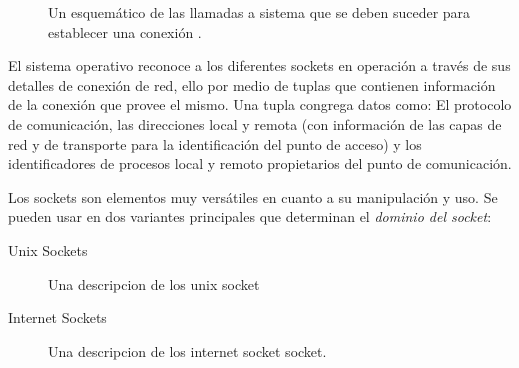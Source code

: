 \begin{figure}[h!]
	\centering
	\hspace*{\fill}
	\hfill
	\caption{Un esquemático de las llamadas a sistema que se deben suceder para establecer una conexión \cite{book:sockets}.}
	\label{fig:socketHandshake}
	\hspace*{\fill}
\end{figure}

El sistema operativo reconoce a los diferentes sockets en operación a través de sus detalles de conexión de red, ello por medio de tuplas que contienen información de la conexión que provee el mismo. Una tupla congrega datos como: El protocolo de comunicación, las direcciones local y remota (con información de las capas de red y de transporte para la identificación del punto de acceso) y los identificadores de procesos local y remoto propietarios del punto de comunicación.

Los sockets son elementos muy versátiles en cuanto a su manipulación y uso. Se pueden usar en dos variantes principales que determinan el \emph{dominio del socket}:
\begin{description}
\item[Unix Sockets] Una descripcion de los unix socket
\item[Internet Sockets] Una descripcion de los internet socket socket.
\end{description}

